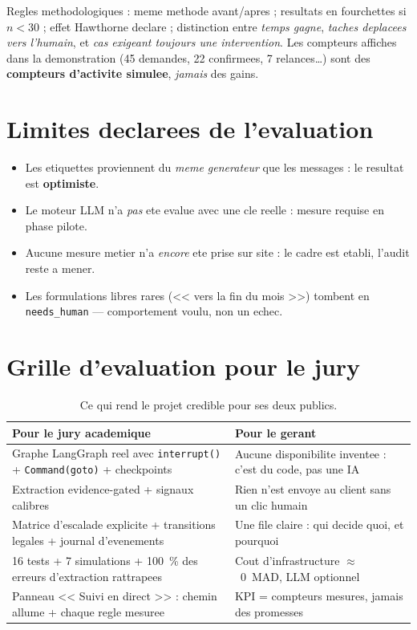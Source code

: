 \documentclass[12pt,a4paper,openany]{report}
\begin{document}
Regles methodologiques : meme methode avant/apres ; resultats en fourchettes si $n < 30$ ; effet Hawthorne declare ; distinction entre \emph{temps gagne}, \emph{taches deplacees vers l'humain}, et \emph{cas exigeant toujours une intervention}. Les compteurs affiches dans la demonstration (45 demandes, 22 confirmees, 7 relances\dots) sont des \textbf{compteurs d'activite simulee}, \emph{jamais} des gains.

\section{Limites declarees de l'evaluation}

\begin{alertbox}
\begin{itemize}
\item Les etiquettes proviennent du \emph{meme generateur} que les messages : le resultat est \textbf{optimiste}.
\item Le moteur LLM n'a \emph{pas} ete evalue avec une cle reelle : mesure requise en phase pilote.
\item Aucune mesure metier n'a \emph{encore} ete prise sur site : le cadre est etabli, l'audit reste a mener.
\item Les formulations libres rares (<< vers la fin du mois >>) tombent en \texttt{needs\_human} --- comportement voulu, non un echec.
\end{itemize}
\end{alertbox}

\section{Grille d'evaluation pour le jury}

\begin{table}[H]\centering\small
\caption{Ce qui rend le projet credible pour ses deux publics.}
\label{tab:credibilite}
\begin{tabularx}{\textwidth}{X X}\toprule
\rowcolor{emsiGreen!30}\textbf{Pour le jury academique} & \textbf{Pour le gerant}\\\midrule
Graphe LangGraph reel avec \texttt{interrupt()} + \texttt{Command(goto)} + checkpoints & Aucune disponibilite inventee : c'est du code, pas une IA\\
Extraction evidence-gated + signaux calibres & Rien n'est envoye au client sans un clic humain\\
Matrice d'escalade explicite + transitions legales + journal d'evenements & Une file claire : qui decide quoi, et pourquoi\\
16 tests + 7 simulations + 100~\% des erreurs d'extraction rattrapees & Cout d'infrastructure $\approx$~0~MAD, LLM optionnel\\
Panneau << Suivi en direct >> : chemin allume + chaque regle mesuree & KPI = compteurs mesures, jamais des promesses\\
\bottomrule
\end{tabularx}
\end{table}
\end{document}
